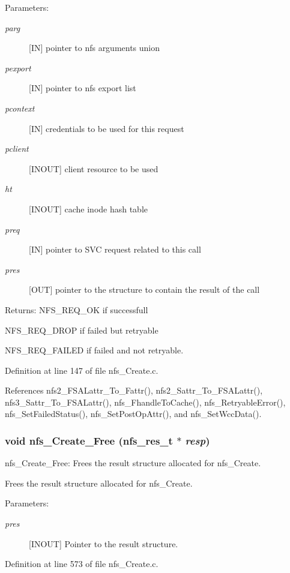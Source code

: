 \begin{Desc}
\item[Parameters:]
\begin{description}
\item[{\em parg}][IN] pointer to nfs arguments union \item[{\em pexport}][IN] pointer to nfs export list \item[{\em pcontext}][IN] credentials to be used for this request \item[{\em pclient}][INOUT] client resource to be used \item[{\em ht}][INOUT] cache inode hash table \item[{\em preq}][IN] pointer to SVC request related to this call \item[{\em pres}][OUT] pointer to the structure to contain the result of the call\end{description}
\end{Desc}
\begin{Desc}
\item[Returns:]NFS\_\-REQ\_\-OK if successfull \par
 NFS\_\-REQ\_\-DROP if failed but retryable \par
 NFS\_\-REQ\_\-FAILED if failed and not retryable. \end{Desc}


Definition at line 147 of file nfs\_\-Create.c.

References nfs2\_\-FSALattr\_\-To\_\-Fattr(), nfs2\_\-Sattr\_\-To\_\-FSALattr(), nfs3\_\-Sattr\_\-To\_\-FSALattr(), nfs\_\-Fhandle\-To\-Cache(), nfs\_\-Retryable\-Error(), nfs\_\-Set\-Failed\-Status(), nfs\_\-Set\-Post\-Op\-Attr(), and nfs\_\-Set\-Wcc\-Data().
\subsubsection{\setlength{\rightskip}{0pt plus 5cm}void nfs\_\-Create\_\-Free (nfs\_\-res\_\-t $\ast$ {\em resp})}\label{nfs__Create_8c_a1}


nfs\_\-Create\_\-Free: Frees the result structure allocated for nfs\_\-Create.

Frees the result structure allocated for nfs\_\-Create.

\begin{Desc}
\item[Parameters:]
\begin{description}
\item[{\em pres}][INOUT] Pointer to the result structure. \end{description}
\end{Desc}


Definition at line 573 of file nfs\_\-Create.c.
